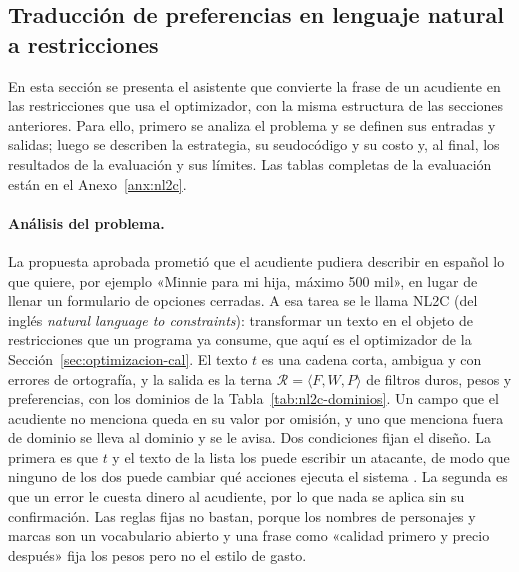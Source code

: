 \subsection{Traducción de preferencias en lenguaje natural a restricciones}
\label{sec:nl2c}

En esta sección se presenta el asistente que convierte la frase de un acudiente en las restricciones
que usa el optimizador, con la misma estructura de las secciones anteriores. Para ello, primero se
analiza el problema y se definen sus entradas y salidas; luego se describen la estrategia, su
seudocódigo y su costo y, al final, los resultados de la evaluación y sus límites. Las tablas
completas de la evaluación están en el Anexo~\ref{anx:nl2c}.

\paragraph{Análisis del problema.} La propuesta aprobada prometió que el acudiente pudiera
describir en español lo que quiere, por ejemplo «Minnie para mi hija, máximo 500 mil», en lugar de
llenar un formulario de opciones cerradas. A esa tarea se le llama NL2C (del inglés \emph{natural
language to constraints}): transformar un texto en el objeto de restricciones que un programa ya
consume, que aquí es el optimizador de la Sección~\ref{sec:optimizacion-cal}. El texto $t$ es una
cadena corta, ambigua y con errores de ortografía, y la salida es la terna
$\mathcal{R}=\langle F,W,P\rangle$ de filtros duros, pesos y preferencias, con los dominios de la
Tabla~\ref{tab:nl2c-dominios}. Un campo que el acudiente no menciona queda en su valor por omisión,
y uno que menciona fuera de dominio se lleva al dominio y se le avisa. Dos condiciones fijan el
diseño. La primera es que $t$ y el texto de la lista los puede escribir un atacante, de modo que
ninguno de los dos puede cambiar qué acciones ejecuta el sistema \citep{greshake2023indirect}. La
segunda es que un error le cuesta dinero al acudiente, por lo que nada se aplica sin su
confirmación. Las reglas fijas no bastan, porque los nombres de personajes y marcas son un
vocabulario abierto y una frase como «calidad primero y precio después» fija los pesos pero no el
estilo de gasto.

